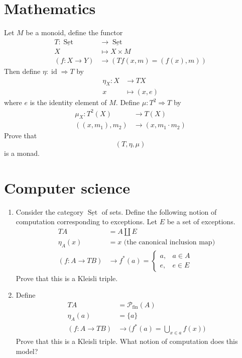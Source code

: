 \documentclass[12pt]{article}
\theoremstyle{plain}
\theoremstyle{definition}
\newcommand{\call}[1]{\mathcal{#1}}
\newcommand{\lto}{\longrightarrow}
\begin{document}
	\section{Mathematics}
	Let $M$ be a monoid, define the functor
	\begin{align*}
		T: \underline{\operatorname{Set}} &\lto \underline{\operatorname{Set}}\\
		X &\longmapsto X \times M\\
		(f: X \to Y) &\lto (Tf(x,m) = (f(x),m))
		\end{align*}
	Then define $\eta: \operatorname{id} \Rightarrow T$ by
	\begin{align*}
		\eta_X: X &\lto TX\\
		x &\longmapsto (x, e)
		\end{align*}
	where $e$ is the identity element of $M$. Define $\mu: T^2 \Rightarrow T$ by
	\begin{align*}
		\mu_X: T^2(X) &\lto T(X)\\
		((x,m_1), m_2) &\lto (x, m_1 \cdot m_2)
		\end{align*}
	Prove that
	\begin{equation}
		(T, \eta, \mu)
		\end{equation}
	is a monad.
	
	\section{Computer science}
	\begin{enumerate}
	\item Consider the category $\underline{\operatorname{Set}}$ of sets. Define the following notion of computation corresponding to exceptions. Let $E$ be a set of exceptions.
	\begin{align*}
		TA &= A \coprod E\\
		\eta_A(x) &= x\text{ (the canonical inclusion map)}\\
		(f: A \lto TB) &\lto f^\ast(a) = 
		\begin{cases}
			a,& a \in A\\
			e, & e \in E
			\end{cases}
		\end{align*}
	Prove that this is a Kleisli triple.
	\item Define
	\begin{align*}
		TA &= \call{P}_{\text{fin}}(A)\\
		\eta_A(a) &= \{ a \}\\
		(f: A \lto TB) &\longrightarrow \big(f^\ast(a) = \bigcup_{x \in a}f(x)\big)
	\end{align*}
	Prove that this is a Kleisli triple. What notion of computation does this model?
	\end{enumerate}
	
	
	
	
	
	
	
\end{document}
